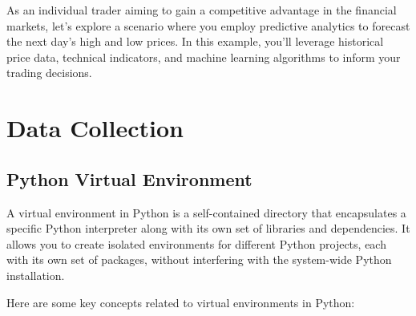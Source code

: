 \documentclass[
  letterpaper,
  DIV=11,
  numbers=noendperiod]{scrreprt}
\begin{document}
As an individual trader aiming to gain a competitive advantage in the
financial markets, let's explore a scenario where you employ predictive
analytics to forecast the next day's high and low prices. In this
example, you'll leverage historical price data, technical indicators,
and machine learning algorithms to inform your trading decisions.

\chapter{Data Collection}\label{data-collection}

\section{Python Virtual Environment}\label{python-virtual-environment}

A virtual environment in Python is a self-contained directory that
encapsulates a specific Python interpreter along with its own set of
libraries and dependencies. It allows you to create isolated
environments for different Python projects, each with its own set of
packages, without interfering with the system-wide Python installation.

Here are some key concepts related to virtual environments in Python:
\end{document}
